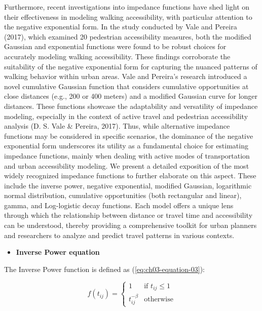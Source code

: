 \documentclass[
11pt, %
oneside, %
english, %
singlespacing, %
]{macthesis} %
\def\tightlist{}
\begin{document}
Furthermore, recent investigations into impedance functions have shed light on their effectiveness in modeling walking accessibility, with particular attention to the negative exponential form. In the study conducted by Vale and Pereira (2017), which examined 20 pedestrian accessibility measures, both the modified Gaussian and exponential functions were found to be robust choices for accurately modeling walking accessibility. These findings corroborate the suitability of the negative exponential form for capturing the nuanced patterns of walking behavior within urban areas. Vale and Pereira's research introduced a novel cumulative Gaussian function that considers cumulative opportunities at close distances (e.g., 200 or 400 meters) and a modified Gaussian curve for longer distances. These functions showcase the adaptability and versatility of impedance modeling, especially in the context of active travel and pedestrian accessibility analysis (D. S. Vale \& Pereira, 2017). Thus, while alternative impedance functions may be considered in specific scenarios, the dominance of the negative exponential form underscores its utility as a fundamental choice for estimating impedance functions, mainly when dealing with active modes of transportation and urban accessibility modeling. We present a detailed exposition of the most widely recognized impedance functions to further elaborate on this aspect. These include the inverse power, negative exponential, modified Gaussian, logarithmic normal distribution, cumulative opportunities (both rectangular and linear), gamma, and Log-logistic decay functions. Each model offers a unique lens through which the relationship between distance or travel time and accessibility can be understood, thereby providing a comprehensive toolkit for urban planners and researchers to analyze and predict travel patterns in various contexts.

\begin{itemize}
\tightlist
\item
  \textbf{Inverse Power equation}
\end{itemize}

The Inverse Power function is defined as (\ref{eq:ch03-equation-03}):

\begin{equation}
f(t_{ij}) =
\begin{cases}
  1 & \text{if } t_{ij} \le 1 \\
  t_{ij}^{-\beta} & \text{otherwise}
\end{cases}
\label{eq:ch03-equation-03}
\end{equation}
\end{document}

